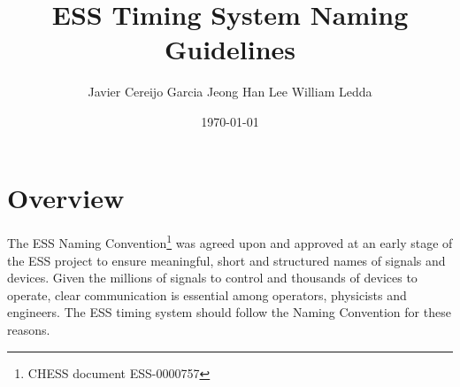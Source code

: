\documentclass[11pt
  , a4paper
  , article
  , oneside
  , showtrims
]{memoir}
\begin{document}


\date{\today}




\title{ESS Timing System Naming Guidelines}
\subtitle{ }%
\author{Javier Cereijo Garcia \newline Jeong Han Lee \newline William Ledda }



\showtrimson

\esstitle
\newpage
\tableofcontents
\newpage



\chapter{Overview}
The ESS Naming Convention{\footnote{CHESS document ESS-0000757\cite{bib:naming}}} was agreed upon and approved at an early stage of the ESS project to ensure meaningful, short and structured names of signals and devices. Given the millions of signals to control and thousands of devices to operate, clear communication is essential among operators, physicists and engineers. The ESS timing system should follow the Naming Convention for these reasons.
\end{document}
